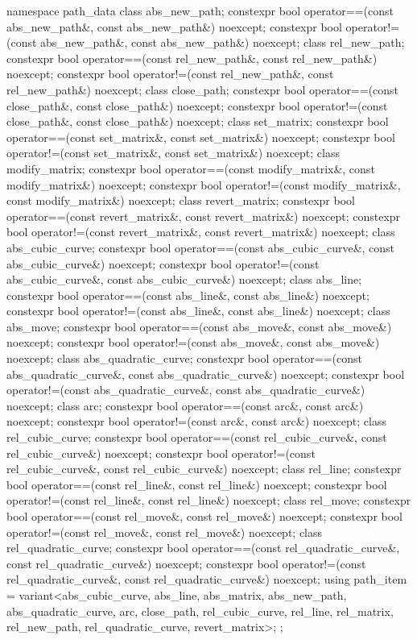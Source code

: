\begin{codeblock}
{{{{  namespace path_data {
    class abs_new_path;
    constexpr bool operator==(const abs_new_path&, const abs_new_path&) 
      noexcept;
    constexpr bool operator!=(const abs_new_path&, const abs_new_path&) 
      noexcept;
    class rel_new_path;
    constexpr bool operator==(const rel_new_path&, const rel_new_path&) 
      noexcept;
    constexpr bool operator!=(const rel_new_path&, const rel_new_path&) 
      noexcept;
    class close_path;
    constexpr bool operator==(const close_path&, const close_path&) noexcept;
    constexpr bool operator!=(const close_path&, const close_path&) noexcept;
    class set_matrix;
    constexpr bool operator==(const set_matrix&, const set_matrix&) noexcept;
    constexpr bool operator!=(const set_matrix&, const set_matrix&) noexcept;
    class modify_matrix;
    constexpr bool operator==(const modify_matrix&, const modify_matrix&) 
      noexcept;
    constexpr bool operator!=(const modify_matrix&, const modify_matrix&) 
      noexcept;
    class revert_matrix;
    constexpr bool operator==(const revert_matrix&, const revert_matrix&) 
      noexcept;
    constexpr bool operator!=(const revert_matrix&, const revert_matrix&) 
      noexcept;
    class abs_cubic_curve;
    constexpr bool operator==(const abs_cubic_curve&, const abs_cubic_curve&) 
      noexcept;
    constexpr bool operator!=(const abs_cubic_curve&, const abs_cubic_curve&) 
      noexcept;
    class abs_line;
    constexpr bool operator==(const abs_line&, const abs_line&) noexcept;
    constexpr bool operator!=(const abs_line&, const abs_line&) noexcept;
    class abs_move;
    constexpr bool operator==(const abs_move&, const abs_move&) noexcept;
    constexpr bool operator!=(const abs_move&, const abs_move&) noexcept;
    class abs_quadratic_curve;
    constexpr bool operator==(const abs_quadratic_curve&,
      const abs_quadratic_curve&) noexcept;
    constexpr bool operator!=(const abs_quadratic_curve&,
      const abs_quadratic_curve&) noexcept;
    class arc;
    constexpr bool operator==(const arc&, const arc&) noexcept;
    constexpr bool operator!=(const arc&, const arc&) noexcept;
    class rel_cubic_curve;
    constexpr bool operator==(const rel_cubic_curve&, const rel_cubic_curve&) 
      noexcept;
    constexpr bool operator!=(const rel_cubic_curve&, const rel_cubic_curve&) 
      noexcept;
    class rel_line;
    constexpr bool operator==(const rel_line&, const rel_line&) noexcept;
    constexpr bool operator!=(const rel_line&, const rel_line&) noexcept;
    class rel_move;
    constexpr bool operator==(const rel_move&, const rel_move&) noexcept;
    constexpr bool operator!=(const rel_move&, const rel_move&) noexcept;
    class rel_quadratic_curve;
    constexpr bool operator==(const rel_quadratic_curve&,
      const rel_quadratic_curve&) noexcept;
    constexpr bool operator!=(const rel_quadratic_curve&,
      const rel_quadratic_curve&) noexcept;
    using path_item = variant<abs_cubic_curve, abs_line, abs_matrix, 
      abs_new_path, abs_quadratic_curve, arc, close_path,
      rel_cubic_curve, rel_line, rel_matrix, rel_new_path, rel_quadratic_curve, 
      revert_matrix>;
  };
  
}}}}
\end{codeblock}
